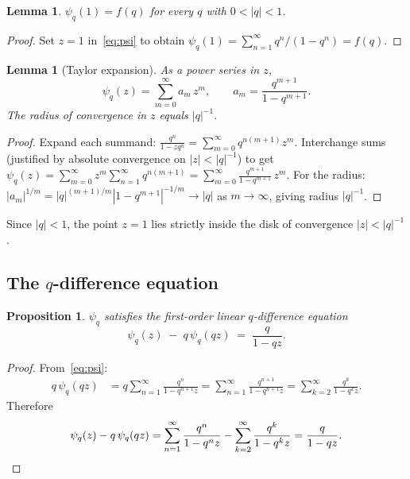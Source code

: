 \documentclass[12pt]{amsart}
\newtheorem{lemma}[theorem]{Lemma}
\newtheorem{proposition}[theorem]{Proposition}
\theoremstyle{definition}
\theoremstyle{remark}
\begin{document}
\begin{lemma}\label{lem:eval}
$\psi_q(1) = f(q)$ for every $q$ with $0<|q|<1$.
\end{lemma}
\begin{proof}
Set $z=1$ in~\eqref{eq:psi} to obtain
$\psi_q(1)=\sum_{n=1}^{\infty}q^n/(1-q^n)=f(q)$.
\end{proof}

\begin{lemma}[Taylor expansion]\label{lem:taylor}
As a power series in $z$,
\[
  \psi_q(z) = \sum_{m=0}^{\infty} a_m\, z^m,
  \qquad a_m = \frac{q^{m+1}}{1-q^{m+1}}.
\]
The radius of convergence in $z$ equals $|q|^{-1}$.
\end{lemma}
\begin{proof}
Expand each summand: $\frac{q^n}{1-zq^n}=\sum_{m=0}^{\infty}q^{n(m+1)}z^m$.
Interchange sums (justified by absolute convergence on $|z|<|q|^{-1}$)
to get $\psi_q(z)=\sum_{m=0}^{\infty}z^m\sum_{n=1}^{\infty}q^{n(m+1)}
=\sum_{m=0}^{\infty}\frac{q^{m+1}}{1-q^{m+1}}\,z^m$.
For the radius: $|a_m|^{1/m}=|q|^{(m+1)/m}|1-q^{m+1}|^{-1/m}\to|q|$
as $m\to\infty$, giving radius $|q|^{-1}$.
\end{proof}

Since $|q|<1$, the point $z=1$ lies strictly inside the disk of
convergence $|z|<|q|^{-1}$.

\subsection{The $q$-difference equation}

\begin{proposition}\label{prop:qde}
$\psi_q$ satisfies the first-order linear $q$-difference equation
\begin{equation}\label{eq:qde}
  \psi_q(z) \;-\; q\,\psi_q(qz) \;=\; \frac{q}{1-qz}.
\end{equation}
\end{proposition}
\begin{proof}
From~\eqref{eq:psi}:
\begin{align*}
  q\,\psi_q(qz)
  &= q\sum_{n=1}^{\infty}\frac{q^n}{1-q^{n+1}z}
   = \sum_{n=1}^{\infty}\frac{q^{n+1}}{1-q^{n+1}z}
   = \sum_{k=2}^{\infty}\frac{q^k}{1-q^k z}.
\end{align*}
Therefore
\[
  \psi_q(z)-q\,\psi_q(qz)
  = \sum_{n=1}^{\infty}\frac{q^n}{1-q^n z}
    - \sum_{k=2}^{\infty}\frac{q^k}{1-q^k z}
  = \frac{q}{1-qz}.\qedhere
\]
\end{proof}
\end{document}
